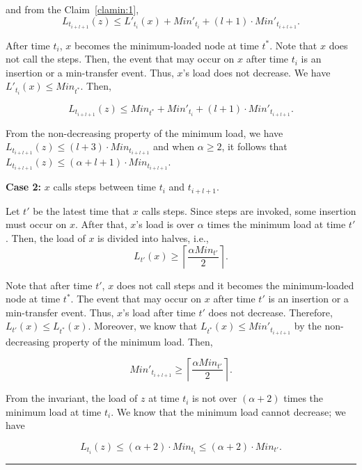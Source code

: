 \documentclass[a4paper]{article}
\newenvironment{proof}{{\bf Proof:}}{\hfill\rule{1.5mm}{3mm}\vspace{0.1in}}
\begin{document}
\begin{proof}
  and from the Claim~\ref{clamin:1},
  \begin{equation}\label{eqn:1.6}
    L_{t_{i+l+1}}(z) \leq L'_{t_i}(x)+Min'_{t_i} + (l+1) \cdot
    Min'_{t_{i+l+1}}.
  \end{equation}
  
  After time $t_i$, $x$ becomes the minimum-loaded node at  time $t^*$.
  Note that $x$ does not call the  {\minbalance} steps. Then, the
  event that may occur on $x$ after time $t_i$ is an insertion or a
  min-transfer event. Thus, $x$'s load does not decrease. We have
  $L'_{t_i}(x)\leq Min_{t^*}$. Then,
  
  \[L_{t_{i+l+1}}(z) \leq Min_{t^*}+Min'_{t_i} + (l+1)\cdot
  Min'_{t_{i+l+1}}. \]
  
  From the non-decreasing property of the minimum load, we have
  $L_{t_{i+l+1}}(z) \leq (l+3)\cdot Min_{t_{i+l+1}}$ and when $\alpha
  \geq 2$, it follows that $L_{t_{i+l+1}}(z)\leq (\alpha+l+1)\cdot Min_{t_{i+l+1}}$.

  \textbf{Case 2:} $x$ calls {\minbalance} steps between time $t_i$
  and $t_{i+l+1}$.
  
  Let $t'$ be the latest time that $x$ calls  {\minbalance}
  steps. Since {\minbalance} steps are invoked, some insertion must occur
  on $x$. After that, $x$'s load is over $\alpha$ times  the minimum
  load at time $t'$. Then, the load of $x$ is divided into halves,
  i.e.,
  \[ L_{t'}(x)\geq \left\lceil \frac{\alpha
      Min_{t'}}{2}\right\rceil.\]
  
  Note that after time $t'$, $x$ does not call {\minbalance} steps
  and it becomes the minimum-loaded node at  time $t^*$. The event that
  may occur on $x$ after time $t'$ is an insertion or a min-transfer
  event. Thus, $x$'s load after time $t'$ does not decrease. Therefore,
  $L_{t'}(x)\leq L_{t^*}(x)$.  Moreover, we know that $L_{t^*}(x)\leq
  Min'_{t_{i+l+1}}$ by the non-decreasing property of the minimum
  load. Then,
  
  \begin{equation}\label{eqn:1.8}
    Min'_{t_{i+l+1}}\geq \left\lceil \frac{\alpha
        Min_{t'}}{2}\right\rceil.
  \end{equation}  
 
  From the invariant, the load of $z$ at time $t_i$ is not
  over $(\alpha+2)$ times  the minimum load at time $t_i$. We know
  that the minimum load cannot decrease; we have

  \begin{equation}\label{eqn:1.10}
    L_{t_i}(z)\leq (\alpha+2)\cdot Min_{t_i}\leq (\alpha+2)\cdot
    Min_{t'}.
  \end{equation}
  

\end{proof}
\end{document}
